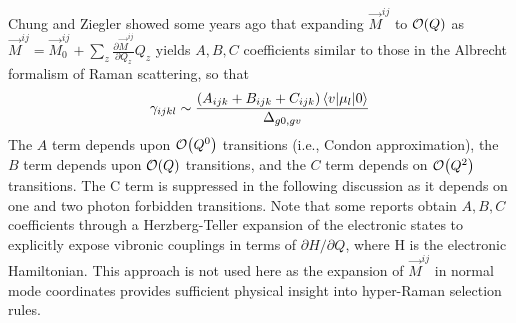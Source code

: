 \documentclass[aip, jcp, reprint, onecolumn]{revtex4-2}
\begin{document}
Chung and Ziegler showed some years ago that expanding $\vec{M}^{ij}$ to $\order{Q}$ as
$\vec{M}^{ij} = \vec{M}^{ij}_0 + \sum_z \frac{\partial\vec{M}^{ij}}{\partial Q_z} Q_z$
yields $A, B, C$ coefficients similar to those in the Albrecht formalism of Raman scattering, \cite{Albrecht1961, Ziegler1988} so that
\begin{equation}
		\gamma_{ijkl} \sim \frac{(A_{ijk} + B_{ijk} + C_{ijk})\mel{v}{\mu_{l}}{0}} {\Delta_{g0,gv}}
\end{equation}
The $A$ term depends upon $\order{Q^0}$ transitions (i.e., Condon approximation), the $B$ term depends upon $\order{Q}$ transitions, and the $C$ term depends on $\order{Q^2}$ transitions. 
The C term is suppressed in the following discussion as it depends on one and two photon forbidden transitions. \cite{Ziegler1988, Neddersen1989, Bonang1992}
Note that some reports obtain $A, B, C$ coefficients through a Herzberg-Teller expansion of the electronic states to explicitly expose vibronic couplings in terms of $\partial H / \partial Q $, where H is the electronic Hamiltonian.\cite{HerzbergTeller1933, Petrov1985, Neddersen1989, Baranov1990}
This approach is not used here as the expansion of $\vec{M}^{ij}$ in normal mode coordinates provides sufficient physical insight into hyper-Raman selection rules. 
\end{document}

